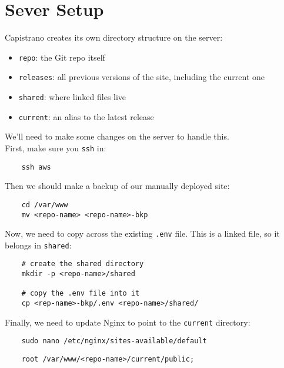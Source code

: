 \inputminted{ruby}{04/resources/02/04-production.rb}


\section{Sever Setup}

Capistrano creates its own directory structure on the server:

\begin{itemize}
    \item \texttt{repo}: the Git repo itself
    \item \texttt{releases}: all previous versions of the site, including the current one
    \item \texttt{shared}: where linked files live
    \item \texttt{current}: an alias to the latest release
\end{itemize}

We'll need to make some changes on the server to handle this.
\\

First, make sure you \texttt{ssh} in:

\begin{verbatim}
    ssh aws
\end{verbatim}

Then we should make a backup of our manually deployed site:

\begin{verbatim}
    cd /var/www
    mv <repo-name> <repo-name>-bkp
\end{verbatim}

Now, we need to copy across the existing \texttt{.env} file. This is a linked file, so it belongs in \texttt{shared}:

\begin{verbatim}
    # create the shared directory
    mkdir -p <repo-name>/shared

    # copy the .env file into it
    cp <rep-name>-bkp/.env <repo-name>/shared/
\end{verbatim}

Finally, we need to update Nginx to point to the \texttt{current} directory:

\begin{verbatim}
    sudo nano /etc/nginx/sites-available/default
\end{verbatim}

\begin{verbatim}
    root /var/www/<repo-name>/current/public;
\end{verbatim}

